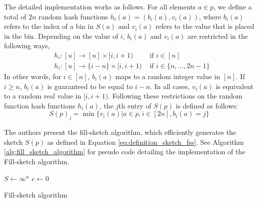 The detailed implementation works as follows. For all elements $a \in p$, we define a total of $2n$ random hash functions $h_i(a) = (b_i(a), v_i(a))$, where $b_i(a)$ refers to the index of a bin in $S(a)$ and $v_i(a)$ refers to the value that is placed in the bin. Depending on the value of $i$, $b_i(a)$ and $v_i(a)$ are restricted in the following ways,
\begin{equation}
\begin{aligned}
    &h_i: [u] \rightarrow [n] \times [i, i + 1)  & \text{ if } i \in [n] \\
    &h_i: [u] \rightarrow \{i-n\} \times [i, i + 1)  & \text{ if } i \in \{n,...,2n-1\}
\end{aligned}
\label{eq:random_hash_functions_fss}
\end{equation}
In other words, for $i \in [n]$, $b_i(a)$ maps to a random integer value in $[n]$. If $i \geq n$, $b_i(a)$ is guaranteed to be equal to $i-n$. In all cases, $v_i(a)$ is equivalent to a random real value in $[i, i + 1)$. Following these restrictions on the random function hash functions $h_i(a)$, the $j$th entry of $S(p)$ is defined as follows:
\begin{equation}
    S(p)_j = \min \{v_i(a) | a \in p, i\in [2n], b_i(a)=j\}
    \label{eq:definition_sketch_fss}
\end{equation}

The authors present the fill-sketch algorithm, which efficiently generates the sketch $S(p)$ as defined in Equation \ref{eq:definition_sketch_fss}. See Algorithm \ref{alg:fill_sketch_algorithm} for pseudo code detailing the implementation of the Fill-sketch algorithm.

\begin{algorithm}
     
$S \gets \infty^n$\;
$c \gets 0$\;
\caption{Fill-sketch algorithm}
\label{alg:fill_sketch_algorithm}
\end{algorithm}

